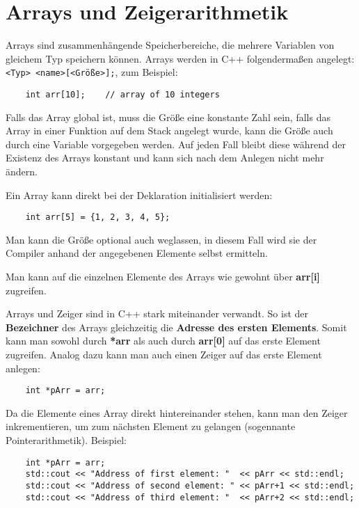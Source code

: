 \section{Arrays und Zeigerarithmetik}
Arrays sind zusammenhängende Speicherbereiche, die mehrere Variablen von gleichem Typ speichern können.
Arrays werden in C++ folgendermaßen angelegt: \texttt{<Typ> <name>[<Größe>];}, zum Beispiel:

\begin{lstlisting}
	int arr[10];	// array of 10 integers
\end{lstlisting}

Falls das Array global ist, muss die Größe eine konstante Zahl sein, falls das Array in einer Funktion auf dem Stack angelegt wurde, kann die Größe auch durch eine Variable vorgegeben werden.
Auf jeden Fall bleibt diese während der Existenz des Arrays konstant und kann sich nach dem Anlegen nicht mehr ändern.

Ein Array kann direkt bei der Deklaration initialisiert werden:

\begin{lstlisting}
	int arr[5] = {1, 2, 3, 4, 5};
\end{lstlisting}

Man kann die Größe optional auch weglassen, in diesem Fall wird sie der Compiler anhand der angegebenen Elemente selbst ermitteln.

Man kann auf die einzelnen Elemente des Arrays wie gewohnt über \textbf{arr[i]} zugreifen.

Arrays und Zeiger sind in C++ stark miteinander verwandt.
So ist der \textbf{Bezeichner} des Arrays gleichzeitig die \textbf{Adresse des ersten Elements}.
Somit kann man sowohl durch \textbf{*arr} als auch durch \textbf{arr[0]} auf das erste Element zugreifen.
Analog dazu kann man auch einen Zeiger auf das erste Element anlegen:

\begin{lstlisting}
	int *pArr = arr;
\end{lstlisting}

Da die Elemente eines Array direkt hintereinander stehen, kann man den Zeiger inkrementieren, um zum  nächsten Element zu gelangen (sogennante Pointerarithmetik).
Beispiel:

\begin{lstlisting}
	int *pArr = arr;
	std::cout << "Address of first element: "  << pArr << std::endl;
	std::cout << "Address of second element: " << pArr+1 << std::endl;
	std::cout << "Address of third element: "  << pArr+2 << std::endl;
\end{lstlisting}

